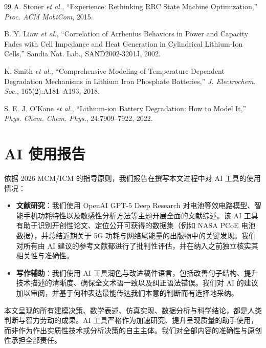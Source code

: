 \documentclass[11pt,a4paper]{ctexart}
\begin{document}
\begin{thebibliography}{99}
 A. Stoner \textit{et al.}, ``Experience: Rethinking RRC State Machine Optimization,'' \textit{Proc. ACM MobiCom}, 2015.

 B. Y. Liaw \textit{et al.}, ``Correlation of Arrhenius Behaviors in Power and Capacity Fades with Cell Impedance and Heat Generation in Cylindrical Lithium-Ion Cells,'' Sandia Nat. Lab., SAND2002-3201J, 2002.

 K. Smith \textit{et al.}, ``Comprehensive Modeling of Temperature-Dependent Degradation Mechanisms in Lithium Iron Phosphate Batteries,'' \textit{J. Electrochem. Soc.}, 165(2):A181--A193, 2018.

 S. E. J. O'Kane \textit{et al.}, ``Lithium-ion Battery Degradation: How to Model It,'' \textit{Phys. Chem. Chem. Phys.}, 24:7909--7922, 2022.

\end{thebibliography}

\newpage

\appendix
\section{AI 使用报告}

依据 2026 MCM/ICM 的指导原则，我们报告在撰写本文过程中对 AI 工具的使用情况：

\begin{itemize}[leftmargin=2em]
\item \textbf{文献研究}：我们使用 OpenAI GPT-5 Deep Research 对电池等效电路模型、智能手机功耗特性以及敏感性分析方法等主题开展全面的文献综述。该 AI 工具有助于识别开创性论文、定位公开可获得的数据集（例如 NASA PCoE 电池数据），并总结近期关于 5G 功耗与网络尾能量的出版物中的关键发现。我们对所有由 AI 建议的参考文献都进行了批判性评估，并在纳入之前独立核实其相关性与准确性。
\item \textbf{写作辅助}：我们使用 AI 工具润色与改进稿件语言，包括改善句子结构、提升技术描述的清晰度、确保全文术语一致以及纠正语法错误。我们对 AI 的建议加以审阅，并基于何种表达最能传达我们本意的判断而有选择地采纳。
\end{itemize}

本文呈现的所有建模决策、数学表述、仿真实现、数据分析与科学结论，都是人类判断与智力劳动的成果。AI 工具严格作为加速研究、提升呈现质量的助手使用，而非作为作出实质性技术或分析决策的自主主体。我们对全部内容的准确性与原创性承担全部责任。
\end{document}
